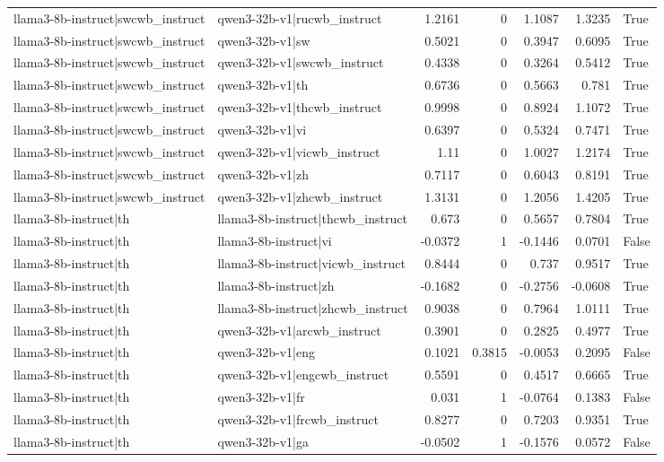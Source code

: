 \begin{table}
\begin{tabular}{l l r r r r l}
llama3-8b-instruct|swcwb_instruct & qwen3-32b-v1|rucwb_instruct & 1.2161 & 0 & 1.1087 & 1.3235 & True \\
llama3-8b-instruct|swcwb_instruct & qwen3-32b-v1|sw & 0.5021 & 0 & 0.3947 & 0.6095 & True \\
llama3-8b-instruct|swcwb_instruct & qwen3-32b-v1|swcwb_instruct & 0.4338 & 0 & 0.3264 & 0.5412 & True \\
llama3-8b-instruct|swcwb_instruct & qwen3-32b-v1|th & 0.6736 & 0 & 0.5663 & 0.781 & True \\
llama3-8b-instruct|swcwb_instruct & qwen3-32b-v1|thcwb_instruct & 0.9998 & 0 & 0.8924 & 1.1072 & True \\
llama3-8b-instruct|swcwb_instruct & qwen3-32b-v1|vi & 0.6397 & 0 & 0.5324 & 0.7471 & True \\
llama3-8b-instruct|swcwb_instruct & qwen3-32b-v1|vicwb_instruct & 1.11 & 0 & 1.0027 & 1.2174 & True \\
llama3-8b-instruct|swcwb_instruct & qwen3-32b-v1|zh & 0.7117 & 0 & 0.6043 & 0.8191 & True \\
llama3-8b-instruct|swcwb_instruct & qwen3-32b-v1|zhcwb_instruct & 1.3131 & 0 & 1.2056 & 1.4205 & True \\
llama3-8b-instruct|th & llama3-8b-instruct|thcwb_instruct & 0.673 & 0 & 0.5657 & 0.7804 & True \\
llama3-8b-instruct|th & llama3-8b-instruct|vi & -0.0372 & 1 & -0.1446 & 0.0701 & False \\
llama3-8b-instruct|th & llama3-8b-instruct|vicwb_instruct & 0.8444 & 0 & 0.737 & 0.9517 & True \\
llama3-8b-instruct|th & llama3-8b-instruct|zh & -0.1682 & 0 & -0.2756 & -0.0608 & True \\
llama3-8b-instruct|th & llama3-8b-instruct|zhcwb_instruct & 0.9038 & 0 & 0.7964 & 1.0111 & True \\
llama3-8b-instruct|th & qwen3-32b-v1|arcwb_instruct & 0.3901 & 0 & 0.2825 & 0.4977 & True \\
llama3-8b-instruct|th & qwen3-32b-v1|eng & 0.1021 & 0.3815 & -0.0053 & 0.2095 & False \\
llama3-8b-instruct|th & qwen3-32b-v1|engcwb_instruct & 0.5591 & 0 & 0.4517 & 0.6665 & True \\
llama3-8b-instruct|th & qwen3-32b-v1|fr & 0.031 & 1 & -0.0764 & 0.1383 & False \\
llama3-8b-instruct|th & qwen3-32b-v1|frcwb_instruct & 0.8277 & 0 & 0.7203 & 0.9351 & True \\
llama3-8b-instruct|th & qwen3-32b-v1|ga & -0.0502 & 1 & -0.1576 & 0.0572 & False \\

\end{tabular}
\end{table}
